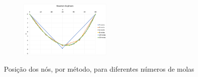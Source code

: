 \documentclass[10pt, a4paper]{article}
\begin{document}
\begin{figure}[H]
\begin{subfigure}[b]{\textwidth}
    \includegraphics[width=0.49\textwidth]{figuras/q2bNRGraf.png}
  \end{subfigure}
  \caption{Posição dos nós, por método, para diferentes números de molas}
\end{figure}
\end{document}
